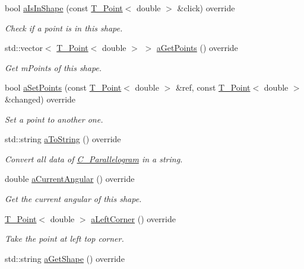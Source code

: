 \begin{DoxyCompactItemize}
bool \hyperlink{classC__Parallelogram_a9ccee396c30606bfe64df416c22586d5}{a\+Is\+In\+Shape} (const \hyperlink{classT__Point}{T\+\_\+\+Point}$<$ double $>$ \&click) override
\begin{DoxyCompactList}\small\item\em Check if a point is in this shape. \end{DoxyCompactList}\item 
std\+::vector$<$ \hyperlink{classT__Point}{T\+\_\+\+Point}$<$ double $>$ $>$ \hyperlink{classC__Parallelogram_a81a9927b24fec7dbe4276ce35aa761cd}{a\+Get\+Points} () override
\begin{DoxyCompactList}\small\item\em Get m\+Points of this shape. \end{DoxyCompactList}\item 
bool \hyperlink{classC__Parallelogram_adfe1c40f2d33955617e3a535c548dfa0}{a\+Set\+Points} (const \hyperlink{classT__Point}{T\+\_\+\+Point}$<$ double $>$ \&ref, const \hyperlink{classT__Point}{T\+\_\+\+Point}$<$ double $>$ \&changed) override
\begin{DoxyCompactList}\small\item\em Set a point to another one. \end{DoxyCompactList}\item 
std\+::string \hyperlink{classC__Parallelogram_add67ef2aba5e14c27e30a958e4843223}{a\+To\+String} () override
\begin{DoxyCompactList}\small\item\em Convert all data of \hyperlink{classC__Parallelogram}{C\+\_\+\+Parallelogram} in a string. \end{DoxyCompactList}\item 
double \hyperlink{classC__Parallelogram_a51959da2b0cf083767f39d8065f395f2}{a\+Current\+Angular} () override
\begin{DoxyCompactList}\small\item\em Get the current angular of this shape. \end{DoxyCompactList}\item 
\hyperlink{classT__Point}{T\+\_\+\+Point}$<$ double $>$ \hyperlink{classC__Parallelogram_aba287e395a90cc8038388fc85dbeb6d8}{a\+Left\+Corner} () override
\begin{DoxyCompactList}\small\item\em Take the point at left top corner. \end{DoxyCompactList}\item 
std\+::string \hyperlink{classC__Parallelogram_a373fdd3ebdfeffcaa0a72ff7001af8ec}{a\+Get\+Shape} () override

\end{DoxyCompactItemize}
